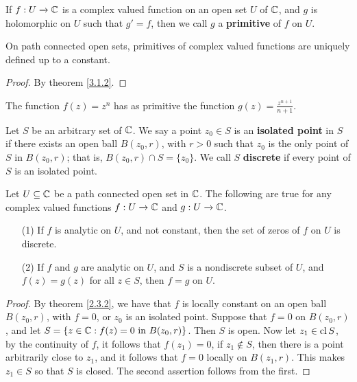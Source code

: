 \begin{definition}
    If $f:U \xrightarrow{} \mathbb{C}$ is a complex valued function on an open set $U$
    of  $\mathbb{C}$, and $g$ is holomorphic on $U$ such that  $g'=f$, then we call $g$
    a \textbf{primitive} of $f$ on $U$.
\end{definition}

\begin{lemma}\label{3.1.3}
    On path connected open sets, primitives of complex valued functions are
    uniquely defined up to a constant.
\end{lemma}
\begin{proof}
    By theorem \ref{3.1.2}.
\end{proof}

\begin{example}\label{example_3.2}
    The function $f(z)=z^n$ has as primitive the function
    $g(z)=\frac{z^{n+1}}{n+1}$.
\end{example}

\begin{definition}
    Let $S$ be an arbitrary set of $\mathbb{C}$. We say a point $z_0 \in S$ is an
    \textbf{isolated point} in $S$ if there exists an open ball  $B(z_0,r)$,
    with $r>0$ such that $z_0$ is the only point of $S$ in  $B(z_0,r)$; that is,
    $B(z_0,r) \cap S=\{z_0\}$. We call $S$  \textbf{discrete} if every point of
    $S$ is an isolated point.
\end{definition}

\begin{theorem}\label{3.1.4}
    Let $U \subseteq \mathbb{C}$ be a path connected open set in  $\mathbb{C}$. The following
    are true for any complex valued functions  $f:U \xrightarrow{} \mathbb{C}$ and $g:U
    \xrightarrow{} \mathbb{C}$.
    \begin{enumerate}
        \item[(1)] If $f$ is analytic on  $U$, and not constant, then the set of
            zeros of  $f$ on  $U$ is discrete.

        \item[(2)] If $f$ and $g$ are analytic on $U$, and $S$ is a nondiscrete
            subset of $U$, and  $f(z)=g(z)$ for all $z \in S$, then $f=g$ on
            $U$.
    \end{enumerate}
\end{theorem}
\begin{proof}
    By theorem \ref{2.3.2}, we have that $f$ is locally constant on an open ball
    $B(z_0,r)$, with $f=0$, or  $z_0$ is an isolated point. Suppose that $f=0$
    on  $B(z_0,r)$, and let $S=\{z \in \mathbb{C} : f(z)=0 \text{ in } B(z_0,r)\}$. Then
    $S$ is open. Now let  $z_1 \in \operatorname{cl}{S}$, by the continuity of $f$, it follows
    that  $f(z_1)=0$, if $z_1 \notin S$, then there is a point arbitrarily close
    to $z_1$, and it follows that  $f=0$ locally on  $B(z_1,r)$. This makes $z_1
    \in S$ so that $S$ is closed. The second assertion follows from the first.
\end{proof}

